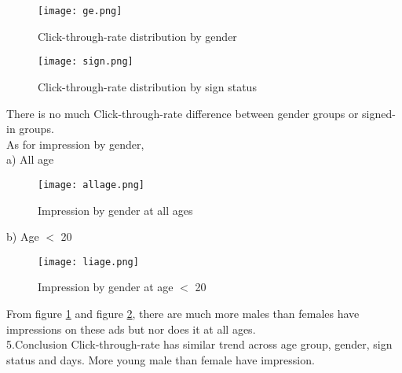 \documentclass{article}
\begin{document}
\begin{figure}[H] 
\begin{center} 
\texttt{[image: ge.png]}  
\caption{Click-through-rate distribution by gender} 
\end{center} 
\end{figure}
\begin{figure}[H] 
\begin{center} 
\texttt{[image: sign.png]}  
\caption{Click-through-rate distribution by sign status} 
\end{center} 
\end{figure}
There is no much Click-through-rate difference between gender groups or signed-in groups. \\
As for impression by gender, \\
a) All age\\
\begin{figure}[H] 
\begin{center} 
\texttt{[image: allage.png]}  
\caption{Impression by gender at all ages} 
\label{1}
\end{center} 
\end{figure}
b) Age $<$ 20 \\
\begin{figure}[H] 
\begin{center} 
\texttt{[image: liage.png]}  
\caption{Impression by gender at age $<$ 20} 
\label{2}
\end{center} 
\end{figure}
From figure \ref{1} and figure \ref{2},  there are much more males than females have impressions on these ads but nor does it at all ages. \\
5.Conclusion
Click-through-rate has similar trend across age group, gender, sign status and days. More young male than female have impression.
\end{document}
